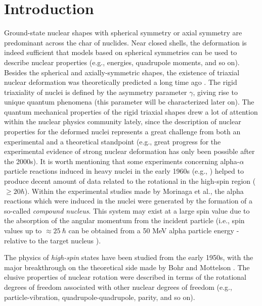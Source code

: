 \chapter{Introduction}

Ground-state nuclear shapes with spherical symmetry or axial symmetry are predominant across the char of nuclides. Near closed shells, the deformation is indeed sufficient that models based on spherical symmetries can be used to describe nuclear properties (e.g., energies, quadrupole moments, and so on). Besides the spherical and axially-symmetric shapes, the existence of triaxial nuclear deformation was theoretically predicted a long time ago \cite{bohr1998nuclear}. The rigid triaxiality of nuclei is defined by the asymmetry parameter $\gamma$, giving rise to unique quantum phenomena (this parameter will be characterized later on). The quantum mechanical properties of the rigid triaxial shapes drew a lot of attention within the nuclear physics community lately, since the description of nuclear properties for the deformed nuclei represents a great challenge from both an experimental and a theoretical standpoint (e.g., great progress for the experimental evidence of strong nuclear deformation has only been possible after the 2000s). It is worth mentioning that some experiments concerning alpha-$\alpha$ particle reactions induced in heavy nuclei in the early 1960s (e.g., \cite{morinaga1963gamma}) helped to produce decent amount of data related to the rotational in the high-spin region ($\geq 20 \hbar$). Within the experimental studies made by Morinaga et al., the alpha reactions which were induced in the nuclei were generated by the formation of a so-called \emph{compound nucleus}. This system may exist at a large spin value due to the absorption of the angular momentum from the incident particle (i.e., spin values up to $\approx25\ \hbar$ can be obtained from a 50 MeV alpha particle energy - relative to the target nucleus \cite{morinaga1963gamma}).

The physics of \emph{high-spin} states have been studied from the early 1950s, with the major breakthrough on the theoretical side made by Bohr and Mottelson \cite{bohr1998nuclear}. The elusive properties of nuclear rotation were described in terms of the rotational degrees of freedom associated with other nuclear degrees of freedom (e.g., particle-vibration, quadrupole-quadrupole, parity, and so on). 